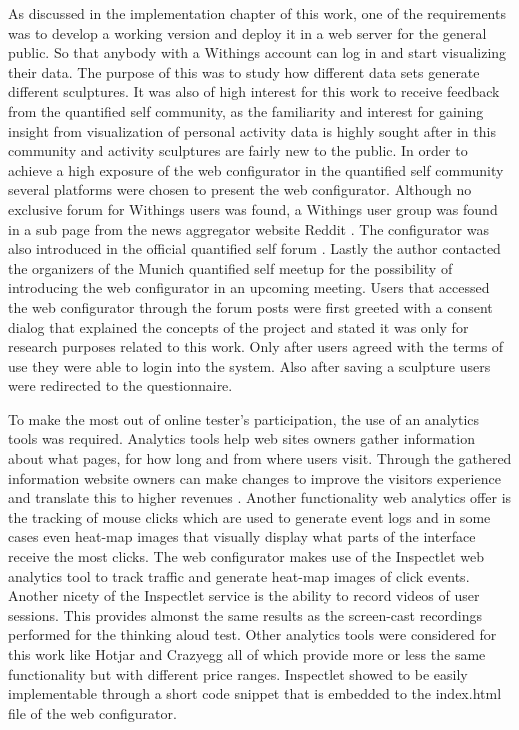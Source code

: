 \documentclass[../medieninformatik-arbeit.tex]{subfiles}
\begin{document}
As discussed in the implementation chapter of this work, one of the requirements was to develop a working version and deploy it in a web server for the general public. So that anybody with a Withings account can log in and start visualizing their data. The purpose of this was to study how different data sets generate different sculptures. It was also of high interest for this work to receive feedback from the quantified self community, as the familiarity and interest for gaining insight from visualization of personal activity data is highly sought after in this community and activity sculptures are fairly new to the public. In order to achieve a high exposure of the web configurator in the quantified self community several platforms were chosen to present the web configurator. Although no exclusive forum for Withings users was found, a Withings user group was found in a sub page from the news aggregator website Reddit \cite{redditwithings}. The configurator was also introduced in the official quantified self forum \cite{qfselfforum}. Lastly the author contacted the organizers of the Munich quantified self meetup \cite{qfselfmeetup} for the possibility of introducing the web configurator in an upcoming meeting. Users that accessed the web configurator through the forum posts were first greeted with a consent dialog that explained the concepts of the project and stated it was only for research purposes related to this work. Only after users agreed with the terms of use they were able to login into the system. Also after saving a sculpture users were redirected to the questionnaire. 

To make the most out of online tester's participation, the use of an analytics tools was required. Analytics tools help web sites owners gather information about what pages, for how long and from where users visit. Through the gathered information website owners can make changes to improve the visitors experience and translate this to higher revenues \cite{peterson2004web}. Another functionality web analytics offer is the tracking of mouse clicks which are used to generate event logs and in some cases even heat-map images that visually display what parts of the interface receive the most clicks. The web configurator makes use of the Inspectlet web analytics tool \cite{inspectlet} to track traffic and generate heat-map images of click events. Another nicety of the Inspectlet service is the ability to record videos of user sessions. This provides almonst the same results as the screen-cast recordings performed for the thinking aloud test. Other analytics tools were considered for this work like Hotjar \cite{hotjar} and Crazyegg \cite{inspectlet} all of which provide more or less the same functionality but with different price ranges. Inspectlet showed to be easily implementable through a short code snippet that is embedded to the index.html file of the web configurator. 
\end{document}
